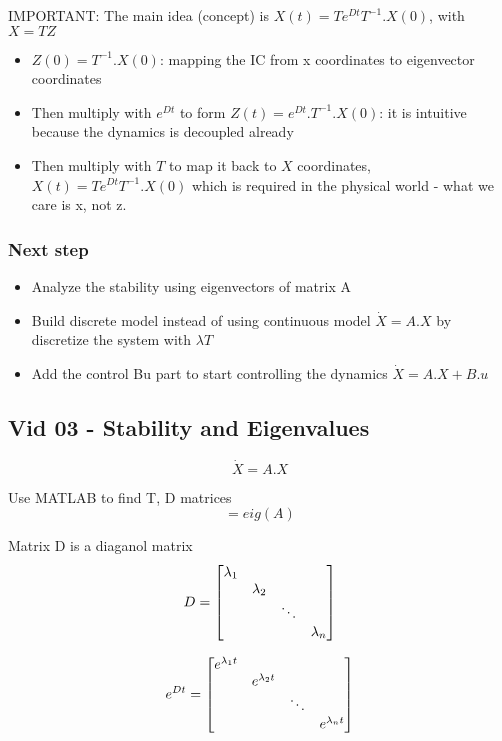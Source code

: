 IMPORTANT: The main idea (concept) is $X(t) = Te^{Dt}T^{-1}.X(0)$, with $X = TZ$
\begin{itemize}
  \item $Z(0) = T^{-1}.X(0)$: mapping the IC from x coordinates to eigenvector coordinates 
  \item Then multiply with $e^{Dt}$ to form $Z(t) = e^{Dt}.T^{-1}.X(0)$: it is intuitive because the dynamics is decoupled already
  \item Then multiply with $T$ to map it back to $X$ coordinates, $X(t) = Te^{Dt}T^{-1}.X(0)$  which is required in the physical world - what we care is x, not z.
\end{itemize}


\subsubsection{Next step}
\begin{itemize}
  \item Analyze the stability using eigenvectors of matrix A
  \item Build discrete model instead of using continuous model $ \dot{X} = A.X $ by discretize the system with $\lambda T$
  \item Add the control Bu part to start controlling the dynamics $\dot{X} = A.X  + B.u$
\end{itemize}


\subsection{Vid 03 - Stability and Eigenvalues}
\begin{equation} 
  \dot{X} = A.X
\end{equation}

Use MATLAB to find T, D matrices
\begin{equation}
  [T, D] = eig(A)
\end{equation}

Matrix D is a diaganol matrix
\begin{equation} 
  D = 
  \begin{bmatrix}
      $$\lambda_{1}$$ &  &  &\\ 
      & $$\lambda_{2}$$   &  &\\ 
      & & \ddots & \\ 
      & & & $$\lambda_{n}$$
  \end{bmatrix}
\end{equation}

\begin{equation} 
  e^{Dt} = 
    \begin{bmatrix} 
        $$e^{\lambda_{1}t}$$  &  &  & \\ 
        & $$e^{\lambda_{2}t}$$   &  & \\ 
        & & \ddots & \\ 
        & & & $$e^{\lambda_{n}t}$$
      \end{bmatrix} 
\end{equation}


